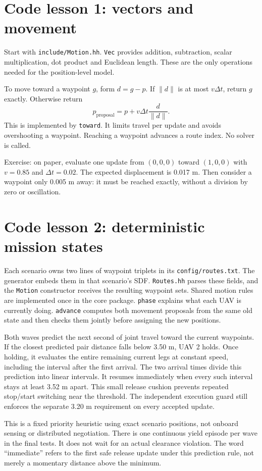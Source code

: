 \section{Code lesson 1: vectors and movement}
Start with \texttt{include/Motion.hh}. \texttt{Vec} provides addition, subtraction, scalar multiplication, dot product and Euclidean length. These are the only operations needed for the position-level model.

To move toward a waypoint $g$, form $d=g-p$. If $\|d\|$ is at most $v\Delta t$, return $g$ exactly. Otherwise return
\[p_{\mathrm{proposal}}=p+v\Delta t\frac{d}{\|d\|}.\]
This is implemented by \texttt{toward}. It limits travel per update and avoids overshooting a waypoint. Reaching a waypoint advances a route index. No solver is called.

Exercise: on paper, evaluate one update from $(0,0,0)$ toward $(1,0,0)$ with $v=0.85$ and $\Delta t=0.02$. The expected displacement is 0.017 m. Then consider a waypoint only 0.005 m away: it must be reached exactly, without a division by zero or oscillation.

\section{Code lesson 2: deterministic mission states}
Each scenario owns two lines of waypoint triplets in its \texttt{config/routes.txt}. The generator embeds them in that scenario's SDF. \texttt{Routes.hh} parses these fields, and the \texttt{Motion} constructor receives the resulting waypoint sets. Shared motion rules are implemented once in the core package. \texttt{phase} explains what each UAV is currently doing. \texttt{advance} computes both movement proposals from the same old state and then checks them jointly before assigning the new positions.

Both waves predict the next second of joint travel toward the current waypoints. If the closest predicted pair distance falls below 3.50 m, UAV 2 holds. Once holding, it evaluates the entire remaining current legs at constant speed, including the interval after the first arrival. The two arrival times divide this prediction into linear intervals. It resumes immediately when every such interval stays at least 3.52 m apart. This small release cushion prevents repeated stop/start switching near the threshold. The independent execution guard still enforces the separate 3.20 m requirement on every accepted update.

This is a fixed priority heuristic using exact scenario positions, not onboard sensing or distributed negotiation. There is one continuous yield episode per wave in the final tests. It does not wait for an actual clearance violation. The word ``immediate'' refers to the first safe release update under this prediction rule, not merely a momentary distance above the minimum.

